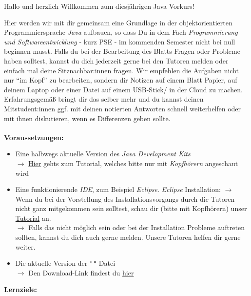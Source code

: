 
\begin{center}
	Hallo und herzlich Willkommen zum diesjährigen Java Vorkurs!\\
\end{center}
Hier werden wir mit dir gemeinsam eine Grundlage in der objektorientierten Programmiersprache \textit{Java} aufbauen, so dass Du in dem Fach \textit{Programmierung und Softwareentwicklung} - kurz PSE - im kommenden Semester nicht bei null beginnen musst.\newline
Falls du bei der Bearbeitung des Blatts Fragen oder Probleme haben solltest, kannst du dich jederzeit gerne bei den Tutoren melden oder einfach mal deine Sitznachbar:innen fragen.\newline
Wir empfehlen die Aufgaben nicht nur \enquote{im Kopf} zu bearbeiten, sondern dir Notizen auf einem Blatt Papier, auf deinem Laptop oder einer Datei auf einem USB-Stick/ in der Cloud zu machen. Erfahrungsgemäß bringt dir das selber mehr und du kannst deinen Mitstudent:innen ggf. mit deinen notierten Antworten schnell weiterhelfen oder mit ihnen diskutieren, wenn es Differenzen geben sollte.\\\\
\textbf{Voraussetzungen:}
\begin{itemize}
	\item Eine halbwegs aktuelle Version des \textit{Java Development Kits}\\
	$\rightarrow$ \href{\jdkTutorial}{Hier} gehts zum Tutorial, welches bitte nur mit \textit{Kopfhörern} angeschaut wird
	\item Eine funktionierende \textit{IDE}, zum Beispiel \textit{Eclipse}. \newline \textit{Eclipse} Installation: \newline
	$\rightarrow$ Wenn du bei der Vorstellung des Installationsvorgangs durch die Tutoren nicht ganz mitgekommen sein solltest, schau dir (bitte mit Kopfhörern) unser \href{\eclipseTutorial}{Tutorial} an.\\
	$\rightarrow$ Falls das nicht möglich sein oder bei der Installation Probleme auftreten sollten, kannst du dich auch gerne melden. Unsere Tutoren helfen dir gerne weiter.
	\item Die aktuelle Version der \texttt{"\jvkpackage"}-Datei\\
	$\rightarrow$ Den Download-Link findest du \href{\jvkpackageurl}{hier}
\end{itemize}
\textbf{Lernziele:}
